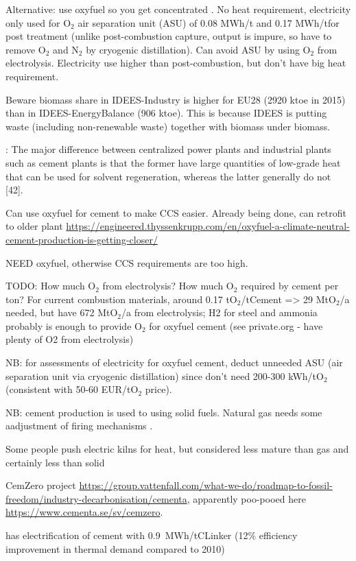 Alternative: use oxyfuel so you get concentrated \co. No heat requirement,
electricity only used for O$_2$ air separation unit (ASU) of 0.08 MWh/t\co
and 0.17 MWh/t\co for post treatment (unlike post-combustion capture, output
is impure, so have to remove O$_2$ and N$_2$ by cryogenic distillation). Can
avoid ASU by using O$_2$ from electrolysis. Electricity use higher than
post-combustion, but don't have big heat requirement.

Beware biomass share in IDEES-Industry is higher for EU28 (2920 ktoe in 2015)
than in IDEES-EnergyBalance (906 ktoe). This is because IDEES is putting waste
(including non-renewable waste) together with biomass under biomass.

: The major difference between centralized power plants and
industrial plants such as cement plants is that the former have large quantities
of low-grade heat that can be used for solvent regeneration, whereas the latter
generally do not [42].


Can use oxyfuel for cement to make CCS easier. Already being done, can retrofit
to older plant
\url{https://engineered.thyssenkrupp.com/en/oxyfuel-a-climate-neutral-cement-production-is-getting-closer/}

NEED oxyfuel, otherwise CCS requirements are too high.

TODO: How much O$_2$ from electrolysis? How much O$_2$ required by cement per
ton? For current combustion materials, around 0.17 tO$_2$/tCement => 29
MtO$_2$/a needed, but have 672 MtO$_2$/a from electrolysis; H2 for steel and
ammonia probably is enough to provide O$_2$ for oxyfuel cement (see private.org
- have plenty of O2 from electrolysis)

NB: for assessments of electricity for oxyfuel cement, deduct unneeded ASU (air
separation unit via cryogenic distillation) since don't need 200-300 kWh/tO$_2$
(consistent with 50-60 EUR/tO$_2$ price).

NB: cement production is used to using solid fuels. Natural gas needs some
aadjustment of firing mechanisms
.

Some people push electric kilns for heat, but considered less mature than gas
and certainly less than solid

CemZero project
\url{https://group.vattenfall.com/what-we-do/roadmap-to-fossil-freedom/industry-decarbonisation/cementa},
apparently poo-pooed here \url{https://www.cementa.se/sv/cemzero}.


 has electrification of cement with 0.9~MWh\el/tCLinker
(12\% efficiency improvement in thermal demand compared to 2010)



